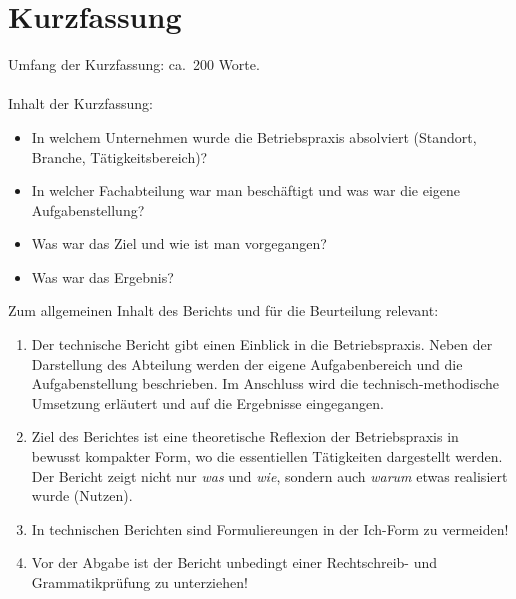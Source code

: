 \documentclass[praktikum,german]{hgbthesis}
\begin{document}


\author{Jakob Moser}


\frontmatter
\maketitle
\tableofcontents

\chapter{Kurzfassung}

\color{blue}   %
Umfang der Kurzfassung: ca.\ 200 Worte.
\\
\\
Inhalt der Kurzfassung:
\begin{itemize}
\item In welchem Unternehmen wurde die Betriebspraxis absolviert (Standort, Branche, Tätigkeitsbereich)?
\item In welcher Fachabteilung war man beschäftigt und was war die eigene Aufgabenstellung?
\item Was war das Ziel und wie ist man vorgegangen?
\item Was war das Ergebnis?
\end{itemize}

\vskip 15mm

\noindent Zum allgemeinen Inhalt des Berichts und für die Beurteilung relevant:\\

\begin{enumerate}
	\item Der technische Bericht gibt einen Einblick in die Betriebspraxis. Neben der Darstellung des Abteilung werden der eigene Aufgabenbereich und die Aufgabenstellung beschrieben. Im Anschluss wird die technisch-methodische Umsetzung erläutert und auf die Ergebnisse eingegangen.

\item Ziel des Berichtes ist eine theoretische Reflexion der Betriebspraxis in bewusst kompakter Form, wo die essentiellen Tätigkeiten dargestellt werden. Der Bericht zeigt nicht nur \emph{was} und \emph{wie}, sondern auch \emph{warum} etwas realisiert wurde (Nutzen). 

\item In technischen Berichten sind Formuliereungen in der Ich-Form zu vermeiden!

\item Vor der Abgabe ist der Bericht unbedingt einer Rechtschreib- und Grammatikprüfung zu unterziehen!
\end{enumerate}
\end{document}
